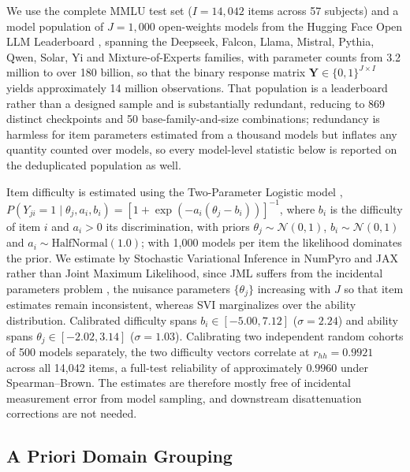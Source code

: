We use the complete MMLU test set ($I = 14{,}042$ items across 57 subjects) and a model population of $J = 1{,}000$ open-weights models from the Hugging Face Open LLM Leaderboard \citep{beeching2023}, spanning the Deepseek, Falcon, Llama, Mistral, Pythia, Qwen, Solar, Yi and Mixture-of-Experts families, with parameter counts from 3.2 million to over 180 billion, so that the binary response matrix $\mathbf{Y} \in \{ 0,1\}^{J \times I}$ yields approximately 14 million observations. That population is a leaderboard rather than a designed sample and is substantially redundant, reducing to 869 distinct checkpoints and 50 base-family-and-size combinations; redundancy is harmless for item parameters estimated from a thousand models but inflates any quantity counted over models, so every model-level statistic below is reported on the deduplicated population as well.

Item difficulty is estimated using the Two-Parameter Logistic model \citep{birnbaum1968,lord1968}, $P(Y_{ji} = 1 \mid \theta_{j},a_{i},b_{i}) = [ 1 + \exp( - a_{i}(\theta_{j} - b_{i}))]^{-1}$, where $b_{i}$ is the difficulty of item $i$ and $a_{i} > 0$ its discrimination, with priors $\theta_{j} \sim \mathcal{N}(0,1)$, $b_{i} \sim \mathcal{N}(0,1)$ and $a_{i} \sim \mathrm{HalfNormal}(1.0)$; with 1,000 models per item the likelihood dominates the prior. We estimate by Stochastic Variational Inference in NumPyro and JAX rather than Joint Maximum Likelihood, since JML suffers from the incidental parameters problem \citep{neyman1948}, the nuisance parameters $\{\theta_{j}\}$ increasing with $J$ so that item estimates remain inconsistent, whereas SVI marginalizes over the ability distribution. Calibrated difficulty spans $b_{i} \in [ - 5.00,7.12]$ ($\sigma = 2.24$) and ability spans $\theta_{j} \in [ - 2.02,3.14]$ ($\sigma = 1.03$). Calibrating two independent random cohorts of 500 models separately, the two difficulty vectors correlate at $r_{hh} = 0.9921$ across all 14,042 items, a full-test reliability of approximately $0.9960$ under Spearman--Brown. The estimates are therefore mostly free of incidental measurement error from model sampling, and downstream disattenuation corrections are not needed.

\subsection{A Priori Domain Grouping}\label{a-priori-domain-grouping}

